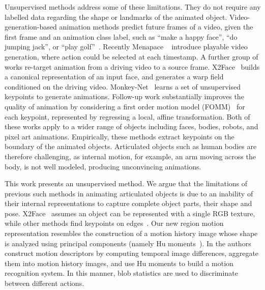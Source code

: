 \documentclass[final]{cvpr}
\begin{document}
Unsupervised methods address some of these limitations. They do not require any labelled data regarding the shape or landmarks of the animated object. Video-generation-based animation methods predict future frames of a video, given the first frame and an animation class label, such as ``make a happy face'', ``do jumping jack'', or ``play golf''~\cite{tulyakov2017mocogan, saito2017temporal, clark2019adversarial}. Recently Menapace \etal~\cite{menapace2021playable} introduce playable video generation, where action could be selected at each timestamp. A further group of works re-target animation from a driving video to a source frame.
X2Face~\cite{wiles2018x2face} builds a canonical representation of an input face, and generates a warp field conditioned on the driving video. 
Monkey-Net~\cite{siarohin2018animating} learns a set of unsupervised keypoints to generate animations. Follow-up work substantially improves the quality of animation by considering a first order motion model (FOMM)~\cite{fomm} for each keypoint, represented by regressing a local, affine transformation. Both of these works apply to a wider range of objects including faces, bodies, robots, and pixel art animations. Empirically, these methods extract keypoints on the boundary of the animated objects. Articulated objects such as human bodies are therefore challenging, as internal motion, for example, an arm moving across the body, is not well modeled, producing unconvincing animations.

This work presents an unsupervised method. We argue that the limitations of previous such methods in animating articulated objects is due to an inability of their internal representations to capture complete object parts, their shape and pose. X2Face~\cite{wiles2018x2face} assumes an object can be represented with a single RGB texture, while other methods find keypoints on edges~\cite{siarohin2018animating,fomm}.
Our new region motion representation resembles the construction of a motion history image whose shape is analyzed using principal components (namely Hu moments~\cite{davis1997representation}). In \cite{davis1997representation} the authors construct motion descriptors by computing temporal image differences, aggregate them into motion history images, and use Hu moments to build a motion recognition system. In this manner, blob statistics are used to discriminate between different actions.


\vspace{-0.2cm}
\end{document}
